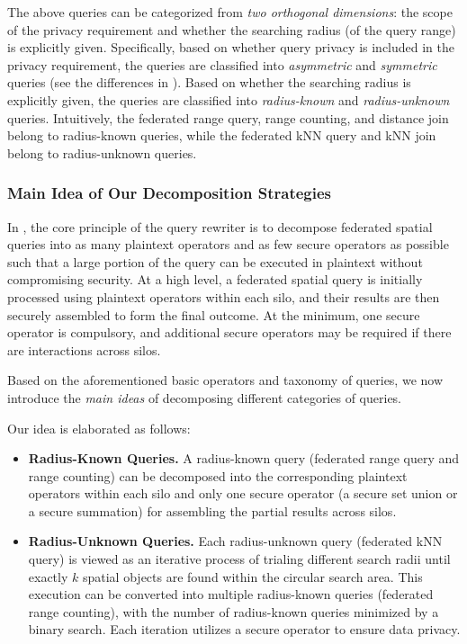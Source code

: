 The above queries can be categorized from \textit{two orthogonal dimensions}: 
the scope of the privacy requirement and whether the searching radius (of the query range) is explicitly given.
Specifically, based on whether query privacy is included in the privacy requirement, the queries are classified into \textit{asymmetric} and \textit{symmetric} queries (see the differences in ).
Based on whether the searching radius is explicitly given, the queries are classified into \textit{radius-known} and \textit{radius-unknown} queries.
Intuitively, the federated range query, range counting, and distance join belong to radius-known queries, while the federated kNN query and kNN join belong to radius-unknown queries.

\subsubsection{Main Idea of Our Decomposition Strategies}\label{sec:rewriter-framework-idea}

In \sysname, the core principle of the query rewriter is to decompose federated spatial queries into as many plaintext operators and as few secure operators as possible such that a large portion of the query can be executed in plaintext without compromising security.
At a high level, a federated spatial query is initially processed using plaintext operators within each silo, and their results are then securely assembled to form the final outcome.
At the minimum, one secure operator is compulsory, and additional secure operators may be required if there are interactions across silos.

Based on the aforementioned basic operators and taxonomy of queries, we now introduce the \textit{main ideas} of decomposing different categories of queries.

Our idea is elaborated as follows:
\begin{itemize}
    \item \textbf{Radius-Known Queries.}
    A radius-known query (\eg federated range query and range counting) can be decomposed into the corresponding plaintext operators within each silo and only one secure operator (\eg a secure set union or a secure summation) for assembling the partial results across silos.

    \item \textbf{Radius-Unknown Queries.}
    Each radius-unknown query (\eg federated kNN query) is viewed as an iterative process of trialing different search radii until exactly $k$ spatial objects are found within the circular search area.
    This execution can be converted into multiple radius-known queries (\eg federated range counting), with the number of radius-known queries minimized by a binary search.
    Each iteration utilizes a secure operator to ensure data privacy.
\end{itemize}

